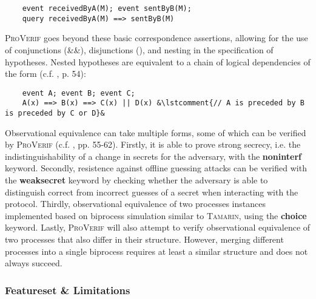 \begin{lstlisting}
    event receivedByA(M); event sentByB(M);
    query receivedByA(M) ==> sentByB(M)
\end{lstlisting}

\noindent
\textsc{ProVerif} goes beyond these basic correspondence assertions, allowing for the use of conjunctions (\textsf{\&\&}), disjunctions (\textsf{\textbar\textbar}), and nesting in the specification of hypotheses.
Nested hypotheses are equivalent to a chain of logical dependencies of the form (c.f. \cite{blanchet2020proverif}, p. 54):

\begin{lstlisting}
    event A; event B; event C;
    A(x) ==> B(x) ==> C(x) || D(x) &\lstcomment{// A is preceded by B is preceded by C or D}&
\end{lstlisting}

Observational equivalence can take multiple forms, some of which can be verified by \textsc{ProVerif} (c.f. \cite{blanchet2020proverif}, pp. 55-62).
Firstly, it is able to prove strong secrecy, i.e. the indistinguishability of a change in secrets for the adversary, with the \textsf{\textbf{noninterf}} keyword.
Secondly, resistence against offline guessing attacks can be verified with the \textsf{\textbf{weaksecret}} keyword by checking whether the adversary is able to distinguish correct from incorrect guesses of a secret when interacting with the protocol.
Thirdly, observational equivalence of two processes instances implemented based on biprocess simulation similar to \textsc{Tamarin}, using the \textsf{\textbf{choice}} keyword.
Lastly, \textsc{ProVerif} will also attempt to verify observational equivalence of two processes that also differ in their structure.
However, merging different processes into a single biprocess requires at least a similar structure and does not always succeed.

\subsubsection{Featureset \& Limitations}

